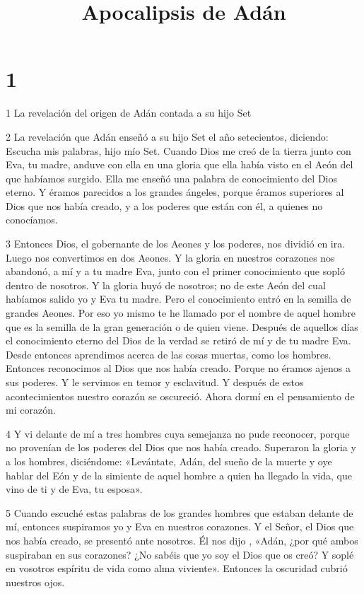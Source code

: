

\title{Apocalipsis de Adán}

\chapter{1}

\par 1 La revelación del origen de Adán contada a su hijo Set

\par 2 La revelación que Adán enseñó a su hijo Set el año setecientos, diciendo: Escucha mis palabras, hijo mío Set. Cuando Dios me creó de la tierra junto con Eva, tu madre, anduve con ella en una gloria que ella había visto en el Aeón del que habíamos surgido. Ella me enseñó una palabra de conocimiento del Dios eterno. Y éramos parecidos a los grandes ángeles, porque éramos superiores al Dios que nos había creado, y a los poderes que están con él, a quienes no conocíamos.

\par 3 Entonces Dios, el gobernante de los Aeones y los poderes, nos dividió en ira. Luego nos convertimos en dos Aeones. Y la gloria en nuestros corazones nos abandonó, a mí y a tu madre Eva, junto con el primer conocimiento que sopló dentro de nosotros. Y la gloria huyó de nosotros; no de este Aeón del cual habíamos salido yo y Eva tu madre. Pero el conocimiento entró en la semilla de grandes Aeones. Por eso yo mismo te he llamado por el nombre de aquel hombre que es la semilla de la gran generación o de quien viene. Después de aquellos días el conocimiento eterno del Dios de la verdad se retiró de mí y de tu madre Eva. Desde entonces aprendimos acerca de las cosas muertas, como los hombres. Entonces reconocimos al Dios que nos había creado. Porque no éramos ajenos a sus poderes. Y le servimos en temor y esclavitud. Y después de estos acontecimientos nuestro corazón se oscureció. Ahora dormí en el pensamiento de mi corazón.

\par 4 Y vi delante de mí a tres hombres cuya semejanza no pude reconocer, porque no provenían de los poderes del Dios que nos había creado. Superaron la gloria y a los hombres, diciéndome: «Levántate, Adán, del sueño de la muerte y oye hablar del Eón y de la simiente de aquel hombre a quien ha llegado la vida, que vino de ti y de Eva, tu esposa».

\par 5 Cuando escuché estas palabras de los grandes hombres que estaban delante de mí, entonces suspiramos yo y Eva en nuestros corazones. Y el Señor, el Dios que nos había creado, se presentó ante nosotros. Él nos dijo , «Adán, ¿por qué ambos suspiraban en sus corazones? ¿No sabéis que yo soy el Dios que os creó? Y soplé en vosotros espíritu de vida como alma viviente». Entonces la oscuridad cubrió nuestros ojos.

